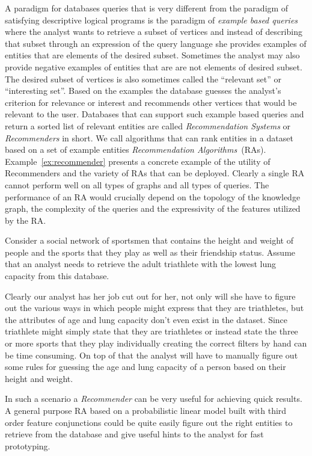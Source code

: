 \documentclass[paper=a4,fontsize=11pt]{scrartcl}
\newcommand{\Exref}[1]{Example~\ref{#1}}
\numberwithin{equation}{section}    %
\numberwithin{figure}{section}      %
\numberwithin{table}{section}       %
\begin{document}
A paradigm for databases queries that is very different from the paradigm
of satisfying descriptive logical programs is the paradigm of
\textit{example based queries} where the analyst wants to retrieve a subset of
vertices and instead of describing that subset through an expression of the query
language she provides {examples} of entities that are elements of
 the desired subset. Sometimes the analyst may also provide negative examples of
 entities that are are not elements of desired subset. The desired subset of
 vertices is also sometimes called the ``{relevant set}'' or
 ``{interesting set}''. Based on the  examples the database guesses the
 analyst's criterion for relevance or interest and {recommends} other
 vertices that would be relevant to the user. Databases that can support such
 example based queries and return a sorted list of relevant entities are called
\textit{Recommendation Systems} or \textit{Recommenders} in short. We call algorithms
that can rank entities in a dataset based on a set of example entities
\textit{Recommendation Algorithms}~(RAs). \Exref{ex:recommender} presents a
concrete example of the utility of Recommenders and the variety of RAs that
can be deployed. Clearly a single RA cannot perform well on all types of graphs and all types of
queries. The performance of an RA would crucially depend on the topology of the
knowledge graph, the complexity of the queries and the expressivity of the
features utilized by the RA.

\begin{example}\label{ex:recommender}
  Consider a social network of sportsmen that contains the height
  and weight of people and the sports that they play as well as their friendship
  status. Assume that an analyst needs to retrieve the adult triathlete
  with the lowest lung capacity from this database.

  Clearly our analyst has her job cut out for her, not only will she have to
  figure out the various ways in which people might express that they are
  triathletes, but the attributes of age and lung capacity don't even exist in
  the dataset. Since triathlete might simply state that they are triathletes or
  instead state the three or more sports that they play individually creating
  the correct filters by hand can be time consuming. On top of that the analyst
  will have to manually figure out some rules for guessing the age and lung capacity of
  a person  based on their height and weight.

  In such a scenario a \textit{Recommender} can be very useful for achieving quick
  results. A general purpose RA based on a probabilistic linear model built with
  third order feature conjunctions could be quite easily figure out the right
  entities to retrieve from the database and give useful hints to the analyst
  for fast prototyping.
\end{example}
\end{document}
